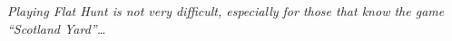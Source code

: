 \emph{Playing Flat Hunt is not very difficult, especially for those that know the game ``Scotland Yard''\ldots}\\

